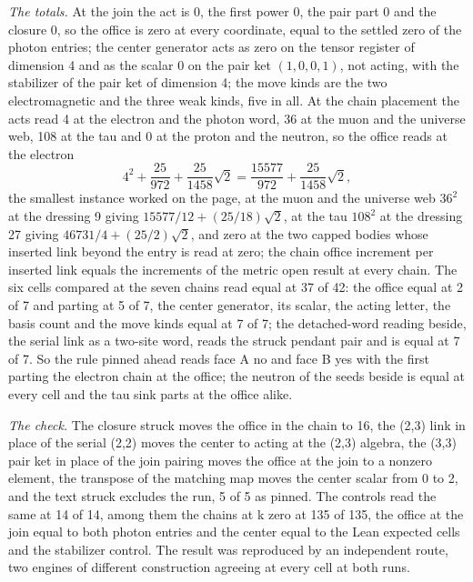 \begin{chproof}
\textit{The totals.} At the join the act is 0, the first power 0, the pair part 0 and the closure 0, so the office is zero at every coordinate, equal to the settled zero of the photon entries; the center generator acts as zero on the tensor register of dimension 4 and as the scalar 0 on the pair ket $(1, 0, 0, 1)$, not acting, with the stabilizer of the pair ket of dimension 4; the move kinds are the two electromagnetic and the three weak kinds, five in all. At the chain placement the acts read 4 at the electron and the photon word, 36 at the muon and the universe web, 108 at the tau and 0 at the proton and the neutron, so the office reads at the electron
\begin{equation}
4^2 + \frac{25}{972} + \frac{25}{1458}\sqrt{2} = \frac{15577}{972} + \frac{25}{1458}\sqrt{2},
\end{equation}
the smallest instance worked on the page, at the muon and the universe web $36^2$ at the dressing 9 giving $15577/12 + (25/18)\sqrt{2}$, at the tau $108^2$ at the dressing 27 giving $46731/4 + (25/2)\sqrt{2}$, and zero at the two capped bodies whose inserted link beyond the entry is read at zero; the chain office increment per inserted link equals the increments of the metric open result at every chain. The six cells compared at the seven chains read equal at 37 of 42: the office equal at 2 of 7 and parting at 5 of 7, the center generator, its scalar, the acting letter, the basis count and the move kinds equal at 7 of 7; the detached-word reading beside, the serial link as a two-site word, reads the struck pendant pair and is equal at 7 of 7. So the rule pinned ahead reads face A no and face B yes with the first parting the electron chain at the office; the neutron of the seeds beside is equal at every cell and the tau sink parts at the office alike.

\textit{The check.} The closure struck moves the office in the chain to 16, the (2,3) link in place of the serial (2,2) moves the center to acting at the (2,3) algebra, the (3,3) pair ket in place of the join pairing moves the office at the join to a nonzero element, the transpose of the matching map moves the center scalar from 0 to 2, and the text struck excludes the run, 5 of 5 as pinned. The controls read the same at 14 of 14, among them the chains at k zero at 135 of 135, the office at the join equal to both photon entries and the center equal to the Lean expected cells and the stabilizer control. The result was reproduced by an independent route, two engines of different construction agreeing at every cell at both runs.
\end{chproof}

